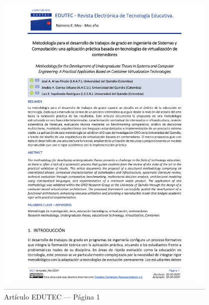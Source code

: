 \begin{figure}[H]
    \centering
    \begin{tcolorbox}[
        colback=white,
        colframe=gray!50,
        boxrule=1pt,
        arc=2pt,
        boxsep=5pt,
        left=3pt,
        right=3pt,
        top=3pt,
        bottom=3pt,
        drop shadow
    ]
        \includegraphics[width=0.95\textwidth,keepaspectratio]{apendices/EDUTEC/1.png}
    \end{tcolorbox}
    \caption{Artículo EDUTEC --- Página 1}\label{fig:edutec-pagina-1}
\end{figure}
\FloatBarrier

